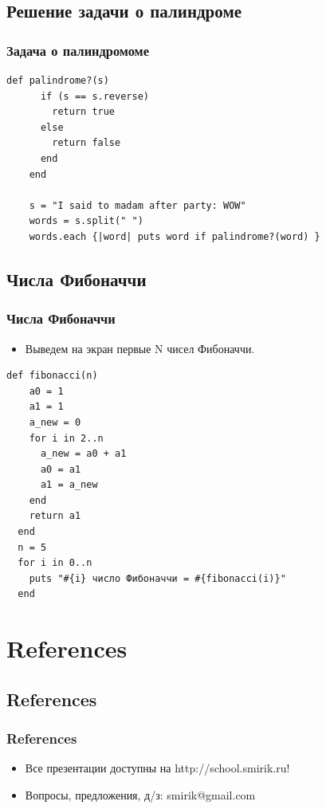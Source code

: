 \documentclass[compress,red]{beamer}
\begin{document}
\subsection{Решение задачи о палиндроме}
\begin{frame}[fragile]
  \frametitle{Задача о палиндромоме}
  \scriptsize{
  \begin{lstlisting}[label=ruby6,caption=Задача о палиндроме]
    def palindrome?(s)
      if (s == s.reverse)
        return true
      else
        return false
      end
    end
    
    s = "I said to madam after party: WOW"
    words = s.split(" ")
    words.each {|word| puts word if palindrome?(word) }
  \end{lstlisting}}
\end{frame}

\subsection{Числа Фибоначчи}
\begin{frame}[fragile]
  \frametitle{Числа Фибоначчи}
  \begin{itemize}
    \item Выведем на экран первые N чисел Фибоначчи.
  \end{itemize}
  \scriptsize{
  \begin{lstlisting}[label=ruby7,caption=Числа Фибоначчи]
  def fibonacci(n)
    a0 = 1
    a1 = 1
    a_new = 0
    for i in 2..n
      a_new = a0 + a1
      a0 = a1
      a1 = a_new
    end
    return a1
  end
  n = 5
  for i in 0..n
    puts "#{i} число Фибоначчи = #{fibonacci(i)}"
  end
  \end{lstlisting}}
\end{frame}

\section{References}
\subsection{References}
\begin{frame}[fragile]
  \frametitle{References}
  \begin{itemize}
    \item Все презентации доступны на http://school.smirik.ru!
    \item Вопросы, предложения, д/з: smirik@gmail.com
  \end{itemize}
\end{frame}
\end{document}
